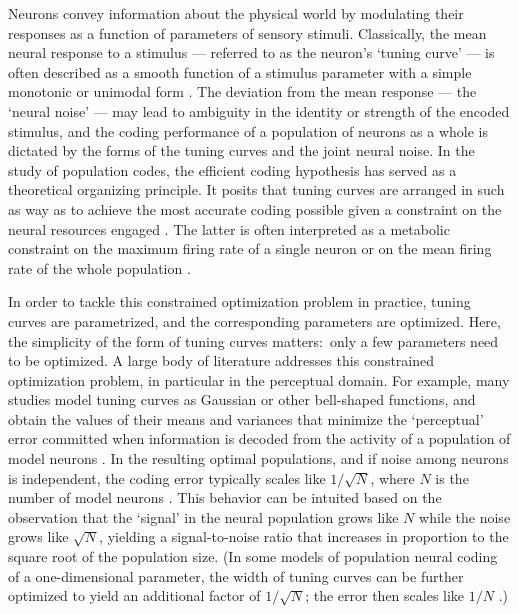 \documentclass[a4paper]{article}%
\begin{document}
Neurons convey information about the physical world by modulating their
responses as a function of parameters of sensory stimuli. Classically, the
mean neural response to a stimulus --- referred to as the neuron's `tuning
curve' --- is often described as a smooth function of a stimulus parameter
with a simple monotonic or unimodal form
\cite{Hubel1959ReceptiveCortex,Georgopoulos1982OnCortex,Taube1990Head-directionAnalysis,Miller1991RepresentationInterneurons,Bremmer1997EyeMST,Dayan2001TheoreticalSystems,Kayaert2005TuningCortex}%
. The deviation from the mean response --- the `neural noise' --- may lead to
ambiguity in the identity or strength of the encoded stimulus, and the coding
performance of a population of neurons as a whole is dictated by the forms of
the tuning curves and the joint neural noise. In the study of population
codes, the efficient coding hypothesis has served as a theoretical organizing
principle. It posits that tuning curves are arranged in such as way as to
achieve the most accurate coding possible given a constraint on the neural
resources engaged
\cite{Barlow1961PossibleMessages,Atick1990TowardsProcessing,Lewicki2002EfficientSounds}%
. The latter is often interpreted as a metabolic constraint on the maximum
firing rate of a single neuron or on the mean firing rate of the whole
population
\cite{Zhang1999NeuronalBroaden,Bethge2002OptimalFails,Wang2016EfficientError}.

In order to tackle this constrained optimization problem in practice, tuning
curves are parametrized, and the corresponding parameters are optimized. Here,
the simplicity of the form of tuning curves matters:\ only a few parameters
need to be optimized. A large body of literature addresses this constrained
optimization problem, in particular in the perceptual domain. For example,
many studies model tuning curves as Gaussian or other bell-shaped functions,
and obtain the values of their means and variances that minimize the
`perceptual' error committed when information is decoded from the activity of
a population of model neurons
\cite{Zhang1999NeuronalBroaden,Deneve1999ReadingObservers,Yaeli2010Error-basedNeurons,Ganguli2014EfficientPopulations,Fiscella2015VisualNeurons}%
. In the resulting optimal populations, and if noise among neurons is
independent, the coding error typically scales like $1/\sqrt{N}$, where $N$ is
the number of model neurons \cite{Seung1993SimpleCodes}. This behavior can be
intuited based on the observation that the `signal' in the neural population
grows like $N$ while the noise grows like $\sqrt{N}$, yielding a
signal-to-noise ratio that increases in proportion to the square root of the
population size. (In some models of population neural coding of a
one-dimensional parameter, the width of tuning curves can be further optimized
to yield an additional factor of $1/\sqrt{N}$; the error then scales like
$1/N$ \cite{Berens2011ReassessingFunctions,Kim2020SuperlinearCodes}.)
\end{document}
